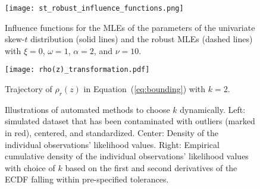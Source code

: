 \documentclass[12pt]{article}
\begin{document}
\begin{figure}[h!]
	\begin{center}
		\texttt{[image: st\_robust\_influence\_functions.png]}
		\caption{Influence functions for the MLEs of the parameters of the univariate skew-$t$ distribution (solid lines) and the robust MLEs (dashed lines) with $\xi=0$, $\omega=1$, $\alpha=2$, and  $\nu=10$.}	\label{fig:inf_robust}
	\end{center}
\end{figure}


\begin{figure}[h!]
	\begin{center}
		\texttt{[image: rho(z)\_transformation.pdf]}
		\caption{{Trajectory of  $\rho_r(z)$ in Equation~(\ref{eq:bounding}) with $k=2$. } }	\label{fig:equation2}
	\end{center}
\end{figure}
 

 
 
\vspace{1cm}
 \begin{figure}[h!]
\begin{center}
\vspace{-.25cm}
\caption{Illustrations of automated methods to choose  $k$ dynamically. Left: simulated dataset that has been contaminated with outliers (marked in red), centered, and standardized.  Center: Density of the individual observations' likelihood values.  Right:  Empirical cumulative density of the  individual observations' likelihood values with choice of $k$ based on the first and second derivatives of the ECDF falling within pre-specified tolerances.  }\label{fig:k_methods}
\end{center}
\end{figure}

% 
\end{document}
